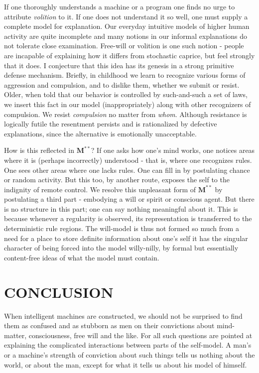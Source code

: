 \documentclass{article}
\begin{document}
If one thoroughly understands a machine or a program one finds no urge to attribute \textit{volition} to it. If one does not understand it so well, one must supply a complete model for explanation. Our everyday intuitive models of higher human activity are quite incomplete and many notions in our informal explanations do not tolerate close examination. Free-will or volition is one such notion - people are incapable of explaining how it differs from stochastic caprice, but feel strongly that it does. I conjecture that this idea has its genesis in a strong primitive defense mechanism. Briefly, in childhood we learn to recognize various forms of aggression and compulsion, and to dislike them, whether we submit or resist. Older, when told that our behavior is controlled by such-and-such a set of laws, we insert this fact in our model (inappropriately) along with other recognizers of compulsion. We resist \textit{compulsion} no matter from \textit{whom}. Although resistance is logically futile the resentment persists and is rationalized by defective explanations, since the alternative is emotionally unacceptable.

How is this reflected in $\mathbf{M^{\ast\ast}}$? If one asks how one's mind works, one notices areas where it is (perhaps incorrectly) understood - that is, where one recognizes rules. One sees other areas where one lacks rules. One can fill in by postulating chance or random activity. But this too, by another route, exposes the self to the indignity of remote control. We resolve this unpleasant form of $\mathbf{M^{\ast\ast}}$ by postulating a third part - embodying a will or spirit or conscious agent. But there is no structure in this part; one can say nothing meaningful about it. This is because whenever a regularity is observed, its representation is transferred to the deterministic rule regions. The will-model is thus not formed so much from a need for a place to store definite information about one's self it has the singular character of being forced into the model willy-nilly, by formal but essentially content-free ideas of what the model must contain.

\section*{CONCLUSION}

When intelligent machines are constructed, we should not be surprised to find them as confused and as stubborn as men on their convictions about mind-matter, consciousness, free will and the like. For all such questions are pointed at explaining the complicated interactions between parts of the self-model. A man's or a machine's strength of conviction about such things tells us nothing about the world, or about the man, except for what it tells us about his model of himself.
\end{document}
